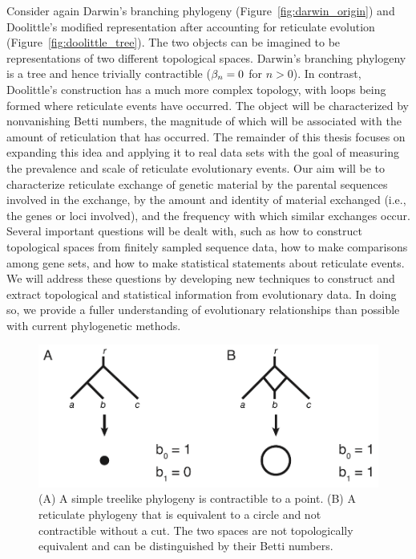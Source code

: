 Consider again Darwin's branching phylogeny (Figure~\ref{fig:darwin_origin}) and Doolittle's modified representation after accounting for reticulate evolution (Figure~\ref{fig:doolittle_tree}).
The two objects can be imagined to be representations of two different topological spaces.
Darwin's branching phylogeny is a tree and hence trivially contractible ($\beta_n=0$ for $n>0$).
In contrast, Doolittle's construction has a much more complex topology, with loops being formed where reticulate events have occurred.
The object will be characterized by nonvanishing Betti numbers, the magnitude of which will be associated with the amount of reticulation that has occurred.
The remainder of this thesis focuses on expanding this idea and applying it to real data sets with the goal of measuring the prevalence and scale of reticulate evolutionary events.
Our aim will be to characterize reticulate exchange of genetic material by the parental sequences involved in the exchange, by the amount and identity of material exchanged (i.e., the genes or loci involved), and the frequency with which similar exchanges occur.
Several important questions will be dealt with, such as how to construct topological spaces from finitely sampled sequence data, how to make comparisons among gene sets, and how to make statistical statements about reticulate events.
We will address these questions by developing new techniques to construct and extract topological and statistical information from evolutionary data.
In doing so, we provide a fuller understanding of evolutionary relationships than possible with current phylogenetic methods.

\begin{figure}
\centering
\includegraphics[width=.8\columnwidth]{./fig/introduction/simple_tree_example.pdf}
\caption[Treelike and reticulate phylogenies]{(A) A simple treelike phylogeny is contractible to a point. (B) A reticulate phylogeny that is equivalent to a circle and not contractible without a cut. The two spaces are not topologically equivalent and can be distinguished by their Betti numbers.}
\label{intro:fig:simple_tree_example}
\end{figure}


